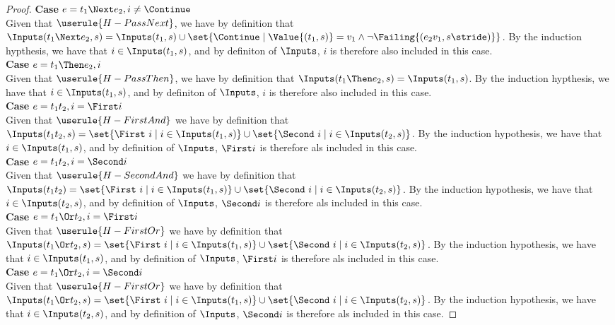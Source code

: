 \begin{proof}
  \noindent\textbf{Case} $e=t_1\Next e_2 , i\neq\Continue$\\
   Given that $\userule{H-PassNext}$, we have by definition that $\Inputs(t_1\Next e_2,s) = \Inputs(t_1,s) \cup \set{\Continue\mid \Value{(t_1,s)} = v_1 \wedge \neg\Failing{(e_2 v_1,s\stride)}}$. By the induction hypthesis, we have that $i\in \Inputs(t_1,s)$, and by definiton of $\Inputs$, $i$ is therefore also included in this case.\\

  \noindent\textbf{Case} $e=t_1\Then e_2 , i$\\
   Given that $\userule{H-PassThen}$, we have by definition that $\Inputs(t_1\Then e_2,s)= \Inputs(t_1,s)$. By the induction hypthesis, we have that $i\in \Inputs(t_1,s)$, and by definiton of $\Inputs$, $i$ is therefore also included in this case.\\

  \noindent\textbf{Case} $e=t_1\And t_2 , i=\First i$\\
   Given that $\userule{H-FirstAnd}$ we have by definition that $\Inputs(t_1\And t_2,s) = \set{\First\ i \mid i \in \Inputs(t_1,s)} \cup \set{\Second\ i \mid i \in \Inputs(t_2,s)}$. By the induction hypothesis, we have that $i\in\Inputs(t_1,s)$, and by definition of $\Inputs$, $\First i$ is therefore als included in this case.\\

  \noindent\textbf{Case} $e=t_1\And t_2 , i=\Second i$\\
   Given that $\userule{H-SecondAnd}$ we have by definition that $\Inputs(t_1\And t_2) = \set{\First\ i \mid i \in \Inputs(t_1,s)} \cup \set{\Second\ i \mid i \in \Inputs(t_2,s)}$. By the induction hypothesis, we have that $i\in\Inputs(t_2,s)$, and by definition of $\Inputs$, $\Second i$ is therefore als included in this case.\\

  \noindent\textbf{Case} $e=t_1\Or t_2 , i=\First i$\\
   Given that $\userule{H-FirstOr}$ we have by definition that $\Inputs(t_1\Or t_2,s) = \set{\First\ i \mid i \in \Inputs(t_1,s)} \cup \set{\Second\ i \mid i \in \Inputs(t_2,s)}$. By the induction hypothesis, we have that $i\in\Inputs(t_1,s)$, and by definition of $\Inputs$, $\First i$ is therefore als included in this case.\\

  \noindent\textbf{Case} $e=t_1\Or t_2 , i=\Second i$\\
   Given that $\userule{H-FirstOr}$ we have by definition that $\Inputs(t_1\Or t_2,s) = \set{\First\ i \mid i \in \Inputs(t_1,s)} \cup \set{\Second\ i \mid i \in \Inputs(t_2,s)}$. By the induction hypothesis, we have that $i\in\Inputs(t_2,s)$, and by definition of $\Inputs$, $\Second i$ is therefore als included in this case.
\end{proof}
